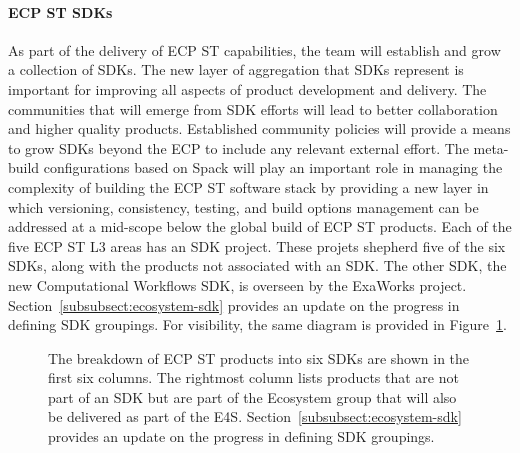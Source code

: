 \paragraph{ECP ST SDKs}
As part of the delivery of ECP ST capabilities, the team will establish and grow a collection of SDKs. The new layer of aggregation that SDKs represent is important for improving all aspects of product development and delivery. The communities that will emerge from SDK efforts will lead to better collaboration and higher quality products. Established community policies will provide a means to grow SDKs beyond the ECP to include any relevant external effort. The meta-build configurations based on Spack will play an important role in managing the complexity of building the ECP ST software stack by providing a new layer in which versioning, consistency, testing, and build options management can be addressed at a mid-scope below the global build of ECP ST products.
Each of the five ECP ST L3 areas has an SDK project. These projets shepherd five of the six SDKs, along with the products not associated with an SDK. The other SDK, the new Computational Workflows SDK, is overseen by the ExaWorks project. Section~\ref{subsubsect:ecosystem-sdk} provides an update on the progress in defining SDK groupings. For visibility, the same diagram is provided in Figure~\ref{fig:sdk-definition1-0}.

\begin{figure}[htb]
	\centering
	\caption{\label{fig:sdk-definition1-0}The breakdown of ECP ST products into six SDKs are shown in the first six columns. The rightmost column lists products that are not part of an SDK but are part of the Ecosystem group that will also be delivered as part of the E4S. Section~\ref{subsubsect:ecosystem-sdk} provides an update on the progress in defining SDK groupings.}
\end{figure}


